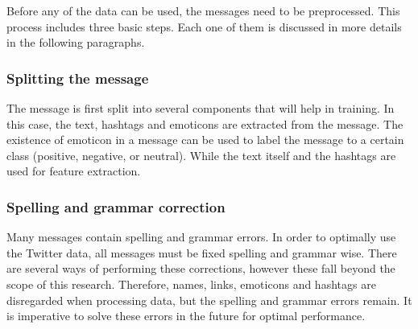 
Before any of the data can be used, the messages need to be preprocessed. This process includes three basic steps. Each one of them is discussed in more details in the following paragraphs.

\subsubsection*{Splitting the message}

The message is first split into several components that will help in training.
In this case, the text, hashtags and emoticons are extracted from the message.
The existence of emoticon in a message can be used to label the message to a certain class (positive, negative, or neutral).
While the text itself and the hashtags are used for feature extraction.

\subsubsection*{Spelling and grammar correction}
Many messages contain spelling and grammar errors. In order to optimally use the Twitter data, all messages must be fixed spelling and grammar wise. There are several ways of performing these corrections, however these fall beyond the scope of this research. Therefore, names, links, emoticons and hashtags are disregarded when processing data, but the spelling and grammar errors remain. It is imperative to solve these errors in the future for optimal performance.


